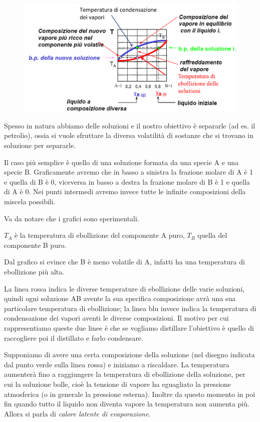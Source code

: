 \begin{figure}[htp]
    \centering
    \includegraphics[width=15cm]{immagini/distillazione_ideale.png}
\end{figure}

Spesso in natura abbiamo delle soluzioni e il nostro obiettivo è separarle (ad es. il petrolio), ossia si vuole sfruttare la diversa volatilità di sostanze che si trovano in soluzione per separarle.

Il caso più semplice è quello di una soluzione formata da una specie A e una specie B. Graficamente avremo che in basso a sinistra la frazione molare di A è 1 e quella di B è 0, viceversa in basso a destra la frazione molare di B è 1 e quella di A è 0. Nei punti intermedi avremo invece tutte le infinite composizioni della miscela possibili.

Va da notare che i grafici sono sperimentali.

$T_A$ è la temperatura di ebollizione del componente A puro, $T_B$ quella del componente B puro.

Dal grafico si evince che B è meno volatile di A, infatti ha una temperatura di ebollizione più alta.

La linea rossa indica le diverse temperature di ebollizione delle varie soluzioni, quindi ogni soluzione AB avente la sua specifica composizione avrà una sua particolare temperatura di ebollizione; la linea blu invece indica la temperatura di condensazione dei vapori aventi le diverse composizioni. Il motivo per cui rappresentiamo queste due linee è che se vogliamo distillare l'obiettivo è quello di raccogliere poi il distillato e farlo condensare.

Supponiamo di avere una certa composizione della soluzione (nel disegno indicata dal punto verde sulla linea rossa) e iniziamo a riscaldare. La temperatura aumenterà fino a raggiungere la temperatura di ebollizione della soluzione, per cui la soluzione bolle, cioè la tensione di vapore ha eguagliato la pressione atmosferica (o in generale la pressione esterna). Inoltre da questo momento in poi fin quando  tutto il liquido non diventa vapore la temperatura non aumenta più. Allora si parla di \textit{calore latente di evaporazione}.

